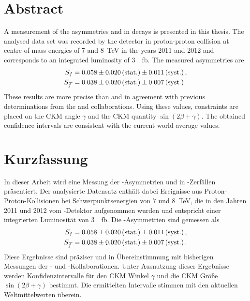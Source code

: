 \section*{Abstract}

\linespread{1.08}\selectfont
A measurement of the \CP asymmetries \Sf and \Sfbar in \BdToDpi decays is presented in this thesis.
The analysed data set was recorded by the \lhcb detector in proton-proton collision  at centre-of-mass energies of \num{7} and \SI{8}{\tera\electronvolt} in the years \num{2011} and \num{2012} and corresponds to an integrated luminosity of \SI{3}{\per\femto\barn}.
The measured \mbox{\CP asymmetries} are
\begin{align}
\mbox{\ensuremath{S_{f}}}&=0.058\pm0.020\mathrm{\,(stat.)}\pm0.011\mathrm{\,(syst.)}\,,\nonumber\\
\mbox{\ensuremath{S_{\kern 1.5pt\overline{\kern -1.5pt f\kern 1.5pt}}}}&=0.038\pm0.020\mathrm{\,(stat.)}\pm0.007\mathrm{\,(syst.)}\,.\nonumber
\end{align}
These results are more precise than and in agreement with previous determinations from the \belle and \babar collaborations.
Using these values, constraints are placed on the CKM angle $\gamma$ and the CKM quantity $\sin\!\left(2\beta+\gamma\right)$.
The obtained confidence intervals are consistent with the current world-average values.

\section*{Kurzfassung}

\linespread{1.08}\selectfont
In dieser Arbeit wird eine Messung der \CP-Asymmetrien \Sf und \Sfbar in \mbox{\BdToDpi}-Zerfällen präsentiert.
Der analysierte Datensatz enthält dabei Ereignisse aus Proton-Proton-Kollisionen bei Schwerpunktsenergien von \num{7} und \SI{8}{\tera\electronvolt}, die in den Jahren \num{2011} und \num{2012} vom \lhcb-Detektor aufgenommen wurden und entspricht einer integrierten Luminosität von \SI{3}{\per\femto\barn}.
Die \mbox{\CP-Asymmetrien} sind gemessen als
\begin{align}
\mbox{\ensuremath{S_{f}}}&=0.058\pm0.020\mathrm{\,(stat.)}\pm0.011\mathrm{\,(syst.)}\,,\nonumber\\
\mbox{\ensuremath{S_{\kern 1.5pt\overline{\kern -1.5pt f\kern 1.5pt}}}}&=0.038\pm0.020\mathrm{\,(stat.)}\pm0.007\mathrm{\,(syst.)}\,.\nonumber
\end{align}
Diese Ergebnisse sind präziser und in Übereinstimmung mit bisherigen Messungen der \belle- und \babar-Kollaborationen.
Unter Ausnutzung dieser Ergebnisse werden Konfidenzintervalle für den CKM Winkel $\gamma$ und die CKM Größe $\sin\!\left(2\beta+\gamma\right)$ bestimmt.
Die ermittelten Intervalle stimmen mit den aktuellen Weltmittelwerten überein.
